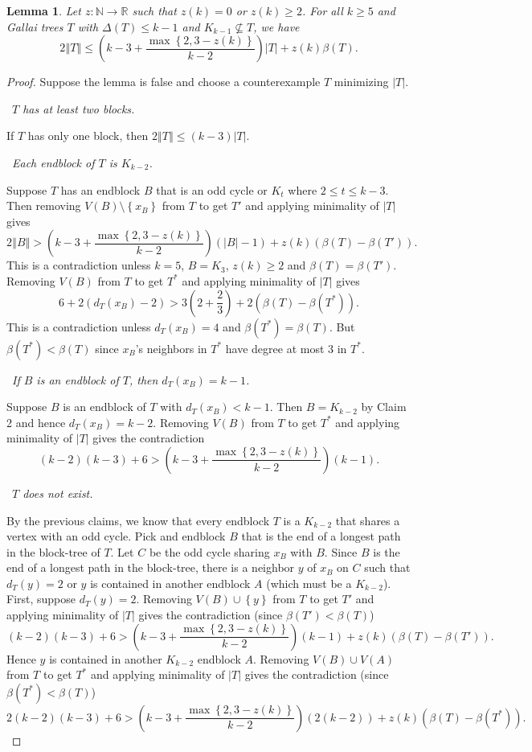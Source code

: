\documentclass[10pt]{article}
\theoremstyle{plain}
\newtheorem{lem}[thm]{Lemma}
\theoremstyle{definition}
\theoremstyle{remark}
\newcommand{\IN}{\mathbb{N}}
\newcommand{\IR}{\mathbb{R}}
\newcommand{\set}[1]{\left\{ #1 \right\}}
\newcommand{\card}[1]{\left|#1\right|}
\newcommand{\size}[1]{\left\Vert#1\right\Vert}
\newcommand{\func}[3]{#1\colon #2 \rightarrow #3}
\newcommand{\parens}[1]{\left( #1 \right)}
\newcommand{\claim}[2]{{\bf Claim #1.}~{\it #2}~~}
\begin{document}
\begin{lem}\label{nokkm1}
	Let $\func{z}{\IN}{\IR}$ such that $z(k) = 0$ or $z(k) \ge 2$.
	For all $k \ge 5$ and Gallai trees $T$ with $\Delta(T) \le k-1$ and $K_{k-1} \not \subseteq T$, we have
	\[2\size{T} \le \parens{k-3 + \frac{\max\set{2, 3-z(k)}}{k-2}}\card{T} + z(k)\beta(T).\]
\end{lem}
\begin{proof}
Suppose the lemma is false and choose a counterexample $T$ minimizing $\card{T}$.  

\noindent\claim{1}{$T$ has at least two blocks.}

If $T$ has only one block, then $2\size{T} \le \parens{k-3}\card{T}$.

\noindent\claim{2}{Each endblock of $T$ is $K_{k-2}$.}

Suppose $T$ has an endblock $B$ that is an odd cycle or $K_t$ where $2 \le t \le k-3$. Then removing $V(B)\setminus\set{x_B}$ from $T$ to get $T'$ and applying minimality of $\card{T}$ gives
\[2\size{B} > \parens{k-3 + \frac{\max\set{2, 3-z(k)}}{k-2}}\parens{\card{B} - 1} + z(k)(\beta(T) - \beta(T')).\]
This is a contradiction unless $k=5$, $B = K_3$, $z(k) \ge 2$ and $\beta(T) = \beta(T')$.  Removing $V(B)$ from $T$ to get $T^*$ and applying minimality of $\card{T}$ gives
\[6 + 2(d_T(x_B) - 2) > 3\parens{2 + \frac{2}{3}} + 2(\beta(T) - \beta(T^*)).\]
This is a contradiction unless $d_T(x_B) = 4$ and $\beta(T^*) = \beta(T)$.  But $\beta(T^*) < \beta(T)$ since $x_B$'s neighbors in $T^*$ have degree at most $3$ in $T^*$.

\noindent\claim{3}{If $B$ is an endblock of $T$, then $d_T(x_B) = k-1$.}

Suppose $B$ is an endblock of $T$ with $d_T(x_B) < k-1$.  Then $B = K_{k-2}$ by Claim 2 and hence $d_T(x_B) = k-2$.  Removing $V(B)$ from $T$ to get $T^*$ and applying minimality of $\card{T}$ gives
the contradiction
\[(k-2)(k-3) + 6 > \parens{k-3 + \frac{\max\set{2, 3-z(k)}}{k-2}}\parens{k-1}.\]

\noindent\claim{4}{$T$ does not exist.}

By the previous claims, we know that every endblock $T$ is a $K_{k-2}$ that shares a vertex with an odd cycle.  Pick and endblock $B$ that is the end of a
longest path in the block-tree of $T$.  Let $C$ be the odd cycle sharing $x_B$ with $B$.  Since $B$ is the end of a longest path in the block-tree, there is
a neighbor $y$ of $x_B$ on $C$ such that $d_T(y) = 2$ or $y$ is contained in another endblock $A$ (which must be a $K_{k-2}$).  
First, suppose $d_T(y) = 2$.
Removing $V(B) \cup \set{y}$ from $T$ to get $T'$ and applying minimality of $\card{T}$ gives the contradiction (since $\beta(T') < \beta(T)$)
\[(k-2)(k-3) + 6 > \parens{k-3 + \frac{\max\set{2, 3-z(k)}}{k-2}}\parens{k-1} + z(k)(\beta(T) - \beta(T')).\]
Hence $y$ is contained in another $K_{k-2}$ endblock $A$.  Removing $V(B) \cup V(A)$ from $T$ to get $T^*$ and applying minimality of $\card{T}$ gives
the contradiction (since $\beta(T^*) < \beta(T)$)
\[2(k-2)(k-3) + 6 > \parens{k-3 + \frac{\max\set{2, 3-z(k)}}{k-2}}\parens{2(k-2)} + z(k)(\beta(T) - \beta(T^*)).\]
\end{proof}
\end{document}
